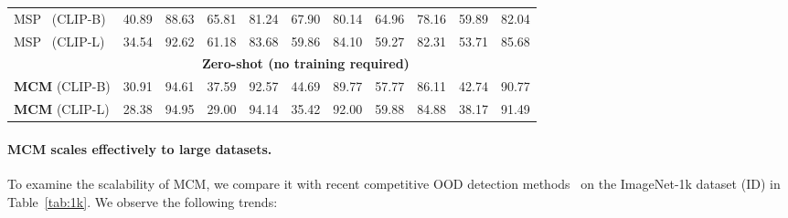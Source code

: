 \documentclass{article}
\begin{document}
\begin{table}[t]
{\begin{tabular}{lcccccccccc}
MSP~\cite{hendrycks2016baseline} (CLIP-B)&40.89&	88.63&	65.81&	81.24&	67.90&	80.14&	64.96&	78.16&	59.89&	82.04\\
MSP~\cite{hendrycks2016baseline} (CLIP-L)&34.54&	92.62&	61.18&	83.68&	59.86&	84.10&	59.27&	82.31&	53.71&	85.68\\
\midrule
 &\multicolumn{9}{c}{\textbf{Zero-shot (no training required)}}   \\
\textbf{MCM} (CLIP-B) 
& 30.91	& 94.61	& 37.59& 	92.57& 	44.69& 	89.77& 	57.77& 	86.11& 	42.74& 	90.77\\
\textbf{MCM} (CLIP-L) 
&28.38&	94.95&	29.00&	94.14&	35.42&	92.00&	59.88&	84.88&38.17&	91.49\\
\bottomrule
\end{tabular}
}
\end{table}

\paragraph{MCM scales effectively to large datasets.} To examine the scalability of MCM, we compare it with recent competitive OOD detection methods~\cite{fort2021exploring,huang2021mos} on the ImageNet-1k dataset (ID) in Table~\ref{tab:1k}.
We observe the following trends: 
\end{document}
